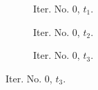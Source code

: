 \documentclass[a4paper,12pt]{amsart}
\numberwithin{equation}{section}
\begin{document}
\begin{figure}[h!]
\begin{subfigure}[t]{0.23\textwidth}
    \caption{Iter. No. 0, $t_1$.}
\end{subfigure}
	\hfill
\begin{subfigure}[t]{0.23\textwidth}
    \caption{Iter. No. 0, $t_2$.}
\end{subfigure}
	\hfill
\begin{subfigure}[t]{0.23\textwidth}
    \caption{Iter. No. 0, $t_3$.}
\end{subfigure}
	

\end{figure}
\end{document}
